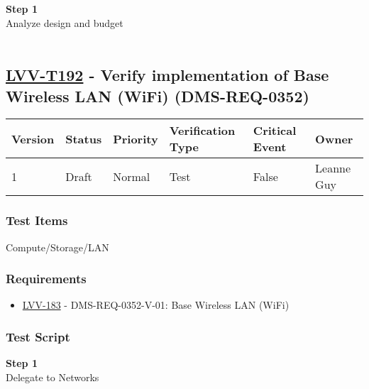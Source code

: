 \textbf{Step 1}\\
Analyze design and budget\\
~\\

\hypertarget{lvv-t192---verify-implementation-of-base-wireless-lan-wifi-dms-req-0352}{%
\subsection{\texorpdfstring{\href{https://jira.lsstcorp.org/secure/Tests.jspa\#/testCase/LVV-T192}{LVV-T192}
- Verify implementation of Base Wireless LAN (WiFi)
(DMS-REQ-0352)}{LVV-T192 - Verify implementation of Base Wireless LAN (WiFi) (DMS-REQ-0352)}}\label{lvv-t192---verify-implementation-of-base-wireless-lan-wifi-dms-req-0352}}

\begin{longtable}[]{@{}llllll@{}}
\toprule
Version & Status & Priority & Verification Type & Critical Event &
Owner\tabularnewline
\midrule
\endhead
1 & Draft & Normal & Test & False & Leanne Guy\tabularnewline
\bottomrule
\end{longtable}

\hypertarget{test-items-168}{%
\subsubsection{Test Items}\label{test-items-168}}

Compute/Storage/LAN~

\hypertarget{requirements-169}{%
\subsubsection{Requirements}\label{requirements-169}}

\begin{itemize}
\tightlist
\item
  \href{https://jira.lsstcorp.org/browse/LVV-183}{LVV-183} -
  DMS-REQ-0352-V-01: Base Wireless LAN (WiFi)
\end{itemize}

\hypertarget{test-script-169}{%
\subsubsection{Test Script}\label{test-script-169}}

\textbf{Step 1}\\
Delegate to Networks\\
~\\

